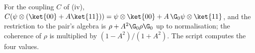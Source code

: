 For the coupling $C$ of (iv), $C(\psi \otimes (\ket{00} + A\ket{11})) = \psi\otimes\ket{00} + A\,\G_{0}\psi\otimes\ket{11}$, and the restriction to the pair's algebra is $\rho + A^{2}\G_{0}\rho\G_{0}$ up to normalisation; the coherence of $\rho$ is multiplied by $(1 - A^{2})/(1 + A^{2})$. The script computes the four values.
